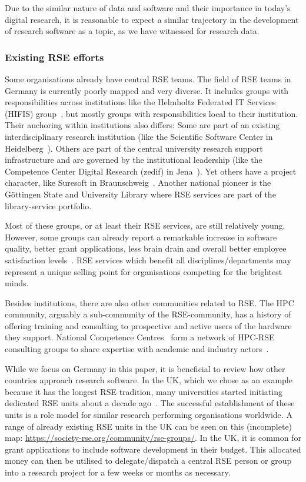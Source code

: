 \documentclass[a4paper]{article}
\begin{document}
Due to the similar nature of data and software and their importance in today's digital research, it is reasonable to expect a similar trajectory in the development of research software as a topic, as we have witnessed for research data.

\subsubsection{Existing RSE efforts}
Some organisations already have central RSE teams.
The field of RSE teams in Germany is currently poorly mapped and very diverse.
It includes groups with responsibilities across institutions like the Helmholtz Federated IT Services (HIFIS) group~\autocite{haupt_hifis_consulting_2021, HIFIS}, but mostly groups with responsibilities local to their institution.
Their anchoring within institutions also differs:
Some are part of an existing interdisciplinary research institution (like the Scientific Software Center in Heidelberg~\autocite{keegan_ssc_whitepaper,HeidelbergSSC}).
Others are part of the central university research support infrastructure and are governed by the institutional leadership (like the Competence Center Digital Research (zedif) in Jena~\autocite{zedifUniJena}).
Yet others have a project character, like Suresoft in Braunschweig~\autocite{Blech2022,SURESOFTLink}.
Another national pioneer is the Göttingen State and University Library where RSE services are part of the library-service portfolio.

Most of these groups, or at least their RSE services, are still relatively young.
However, some groups can already report a remarkable increase in software quality, better grant applications, less brain drain and overall better employee satisfaction levels~\autocite{schimavoigt2023}.
RSE services which benefit all disciplines/departments may represent a unique selling point for organisations competing for the brightest minds.

Besides institutions, there are also other communities related to RSE\@.
The HPC community, arguably a sub-community of the RSE-community, has a history of offering training and consulting to prospective and active users of the hardware they support.
National Competence Centres~\autocite{EuroCCWeb} form a network of HPC-RSE consulting groups to share expertise with academic and industry actors~\autocite{eurocc_success_stories_2023,eurocc_success_stories_2024}.

While we focus on Germany in this paper, it is beneficial to review how other countries approach research software.
In the UK, which we chose as an example because it has the longest RSE tradition, many universities started initiating dedicated RSE units about a decade ago~\autocite{Crouch2013, KDL}.
The successful establishment of these units is a role model for similar research performing organisations worldwide.
A range of already existing RSE units in the UK can be seen on this (incomplete) map: \url{https://society-rse.org/community/rse-groups/}.
In the UK, it is common for grant applications to include software development in their budget.
This allocated money can then be utilised to delegate/dispatch a central RSE person or group into a research project for a few weeks or months as necessary.
\end{document}
